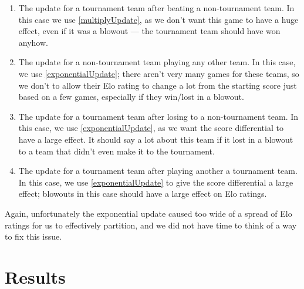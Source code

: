 \documentclass{article}
\begin{document}
\begin{enumerate}
    \item The update for a tournament team after beating a non-tournament team. In this case we use \autoref{multiplyUpdate}, as we don't want this game to have a huge effect, even if it was a blowout --- the tournament team should have won anyhow.
    \item The update for a non-tournament team playing any other team. In this case, we use \autoref{exponentialUpdate}; there aren't very many games for these teams, so we don't to allow their Elo rating to change a lot from the starting score just based on a few games, especially if they win/lost in a blowout.
    \item The update for a tournament team after losing to a non-tournament team. In this case, we use \autoref{exponentialUpdate}, as we want the score differential to have a large effect. It should say a lot about this team if it lost in a blowout to a team that didn't even make it to the tournament.
    \item The update for a tournament team after playing another a tournament team. In this case, we use \autoref{exponentialUpdate} to give the score differential a large effect; blowouts in this case should have a large effect on Elo ratings. 
\end{enumerate}

Again, unfortunately the exponential update caused too wide of a spread of Elo ratings for us to effectively partition, and we did not have time to think of a way to fix this issue.


\section{Results}
\end{document}
